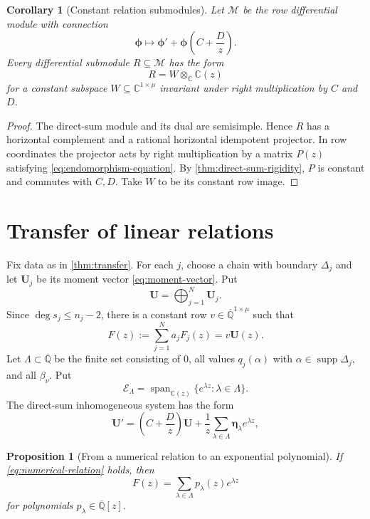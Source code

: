 \documentclass[11pt]{article}
\numberwithin{equation}{section}
\newtheorem{proposition}[proposition]{Proposition}
\newtheorem{corollary}[corollary]{Corollary}
\theoremstyle{definition}
\theoremstyle{remark}
\newcommand{\C}{\mathbb C}
\newcommand{\Qbar}{\overline{\mathbb Q}}
\newcommand{\Span}{\operatorname{span}}
\newcommand{\supp}{\operatorname{supp}}
\newcommand{\Ecal}{\mathcal E}
\newcommand{\Mcal}{\mathcal M}
\begin{document}
\begin{corollary}[Constant relation submodules]
\label{cor:constant-submodules}
Let $\Mcal$ be the row differential module with connection
\[
  \boldsymbol\phi\longmapsto
  \boldsymbol\phi'
  +\boldsymbol\phi\left(C+\frac Dz\right).
\]
Every differential submodule $R\subseteq\Mcal$ has the form
\[
  R=W\otimes_\C\C(z)
\]
for a constant subspace $W\subseteq\C^{1\times\mu}$ invariant under right
multiplication by $C$ and $D$.
\end{corollary}

\begin{proof}
The direct-sum module and its dual are semisimple.  Hence $R$ has a
horizontal complement and a rational horizontal idempotent projector.  In
row coordinates the projector acts by right multiplication by a matrix
$P(z)$ satisfying \eqref{eq:endomorphism-equation}.  By
\cref{thm:direct-sum-rigidity}, $P$ is constant and commutes with $C,D$.
Take $W$ to be its constant row image.
\end{proof}

\section{Transfer of linear relations}
\label{sec:transfer-proof}

Fix data as in \cref{thm:transfer}.  For each $j$, choose a chain with
boundary $\Delta_j$ and let $\mathbf U_j$ be its moment vector
\eqref{eq:moment-vector}.  Put
\[
  \mathbf U=\bigoplus_{j=1}^{N}\mathbf U_j.
\]
Since $\deg s_j\le n_j-2$, there is a constant row
$v\in\Qbar^{1\times\mu}$ such that
\begin{equation}\label{eq:F-vU}
  F(z):=\sum_{j=1}^{N}a_jF_j(z)=v\mathbf U(z).
\end{equation}
Let $\Lambda\subset\Qbar$ be the finite set consisting of $0$, all values
$q_j(\alpha)$ with $\alpha\in\supp\Delta_j$, and all $\beta_\nu$.  Put
\[
  \Ecal_\Lambda
  =\Span_{\C(z)}\{e^{\lambda z}:\lambda\in\Lambda\}.
\]
The direct-sum inhomogeneous system has the form
\begin{equation}\label{eq:direct-inhomogeneous-system}
  \mathbf U'
  =\left(C+\frac Dz\right)\mathbf U
   +\frac1z\sum_{\lambda\in\Lambda}
      \boldsymbol\eta_\lambda e^{\lambda z},
\end{equation}

\begin{proposition}[From a numerical relation to an exponential polynomial]
\label{prop:value-to-exp-poly}
If \eqref{eq:numerical-relation} holds, then
\begin{equation}\label{eq:F-exp-polynomial}
  F(z)=\sum_{\lambda\in\Lambda}p_\lambda(z)e^{\lambda z}
\end{equation}
for polynomials $p_\lambda\in\Qbar[z]$.
\end{proposition}
\end{document}
